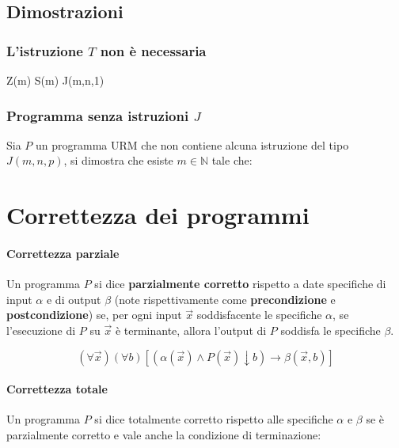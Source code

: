 	\subsection{Dimostrazioni}
	
	\subsubsection{L'istruzione $T$ non è necessaria}
	
	\begin{algorithm}[H]
		\caption{Istruzione $T$}
		\begin{algorithmic}[1]
			\State Z(m)
			\State S(m)
			\State J(m,n,1)
		\end{algorithmic}
	\end{algorithm}
	
	\subsubsection{Programma senza istruzioni $J$}
	Sia $P$ un programma URM che non contiene alcuna istruzione del tipo $J(m,n,p)$, si dimostra che esiste $m \in \mathbb{N}$ tale che:
	
	
	\section{Correttezza dei programmi}
	
	\paragraph{Correttezza parziale} Un programma $P$ si dice \textbf{parzialmente corretto} rispetto a date specifiche di input $\alpha$ e di output $\beta$ (note rispettivamente come \textbf{precondizione} e \textbf{postcondizione}) se, per ogni input $\vec{x}$ soddisfacente le specifiche $\alpha$, se l'esecuzione di $P$ su $\vec{x}$ è terminante, allora l'output di $P$ soddisfa le specifiche $\beta$.

	$$
	(\forall \vec{x})(\forall b) [(\alpha(\vec{x}) \land P(\vec{x})\downarrow b) \rightarrow \beta(\vec{x}, b)]
	$$
	
	\paragraph{Correttezza totale} Un programma $P$ si dice totalmente corretto rispetto alle specifiche $\alpha$ e $\beta$ se è parzialmente corretto e vale anche la condizione di terminazione:
	
